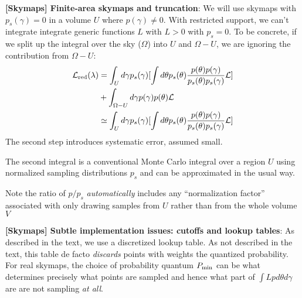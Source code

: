 \noindent \textbf{[Skymaps] Finite-area skymaps and truncation}: We will use skymaps with
$p_s(\gamma)=0$  in a volume $U$ where $p(\gamma)\ne 0$.  With restricted support, we can't integrate
integrate generic functions $L$ with $L>0$ with $p_s=0$.  To be concrete, if we split up the integral over the sky ($\Omega$) into $U$ and
$\Omega-U$, we are ignoring the contribution from $\Omega-U$:
\begin{align}
{\cal L}_{\rm red}(\lambda) &= \int_U d\gamma p_s(\gamma) 
 [\int d\theta p_s(\theta)
  \frac{p(\theta)p(\gamma)}{p_s(\theta)p_s(\gamma)}{\cal L}] 
  \nonumber \\ &
 + \int_{\Omega-U}d\gamma p(\gamma) p(\theta){\cal L} 
\nonumber \\ &
\simeq \int_U d\gamma p_s(\gamma) [\int d\theta p_s(\theta)
  \frac{p(\theta)p(\gamma)}{p_s(\theta)p_s(\gamma)}{\cal L}] 
\end{align}
The second step introduces systematic error, assumed small.

The second integral is a conventional Monte Carlo integral over a region $U$ using normalized sampling distributions $p_s$ and
can be approximated in the usual way.

Note the ratio of $p/p_s$ \emph{automatically} includes any ``normalization factor'' associated with only drawing
samples from $U$ rather than from the whole volume $V$


\noindent \textbf{[Skymaps] Subtle implementation issues: cutoffs and lookup tables}: As described in the text, we use a
discretized lookup table.  As not described in the text, this table de facto \emph{discards} points with weights the
quantized probability.   For real skymaps, the choice of probability quantum $P_{\rm min}$ can be what determines
precisely what points are sampled and hence what part of $\int L p d\theta d\gamma$ are are not sampling \emph{at all}.

